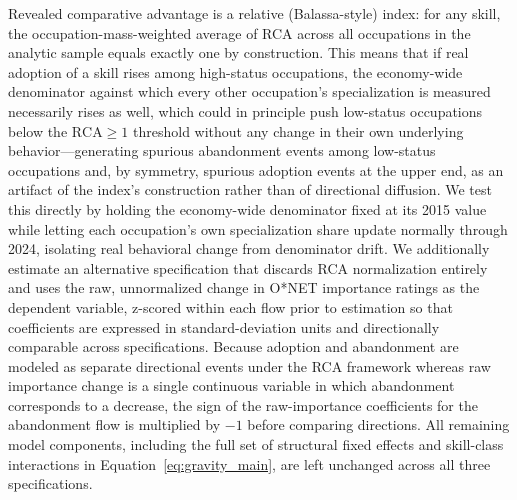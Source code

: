 \documentclass[11pt, letterpaper]{article} %
\begin{document}
Revealed comparative advantage is a relative (Balassa-style) index: for any skill, the occupation-mass-weighted average of RCA across all occupations in the analytic sample equals exactly one by construction. This means that if real adoption of a skill rises among high-status occupations, the economy-wide denominator against which every other occupation's specialization is measured necessarily rises as well, which could in principle push low-status occupations below the $\mathrm{RCA} \geq 1$ threshold without any change in their own underlying behavior---generating spurious abandonment events among low-status occupations and, by symmetry, spurious adoption events at the upper end, as an artifact of the index's construction rather than of directional diffusion. We test this directly by holding the economy-wide denominator fixed at its 2015 value while letting each occupation's own specialization share update normally through 2024, isolating real behavioral change from denominator drift. We additionally estimate an alternative specification that discards RCA normalization entirely and uses the raw, unnormalized change in O*NET importance ratings as the dependent variable, z-scored within each flow prior to estimation so that coefficients are expressed in standard-deviation units and directionally comparable across specifications. Because adoption and abandonment are modeled as separate directional events under the RCA framework whereas raw importance change is a single continuous variable in which abandonment corresponds to a decrease, the sign of the raw-importance coefficients for the abandonment flow is multiplied by $-1$ before comparing directions. All remaining model components, including the full set of structural fixed effects and skill-class interactions in Equation~\ref{eq:gravity_main}, are left unchanged across all three specifications.
\end{document}
